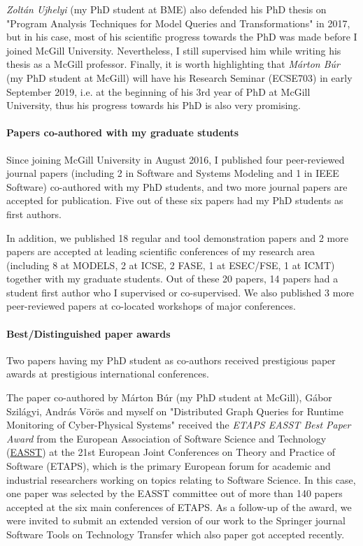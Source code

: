 \emph{Zoltán Ujhelyi} (my PhD student at BME) also defended his PhD thesis on "Program Analysis Techniques for Model Queries and Transformations" in 2017, but in his case, most of his scientific progress towards the PhD was made before I joined McGill University. Nevertheless, I still supervised him while writing his thesis as a McGill professor.  Finally, it is worth highlighting that \emph{Márton Búr} (my PhD student at McGill) will have his Research Seminar (ECSE703) in early September 2019, i.e. at the beginning of his 3rd year of PhD at McGill University, thus his progress towards his PhD is also very promising.

\paragraph{Papers co-authored with my graduate students}
Since joining McGill University in August 2016, I published four peer-reviewed journal papers (including 2 in Software and Systems Modeling and 1 in IEEE Software) co-authored with my PhD students,  and two more journal papers are accepted for publication. Five out of these six papers had my PhD students as first authors. 

In addition, we published 18 regular and tool demonstration papers and 2 more papers are accepted at leading scientific conferences of my research area (including 8 at MODELS, 2 at ICSE, 2 FASE, 1 at ESEC/FSE, 1 at ICMT) together with my graduate students. Out of these 20 papers,  14 papers had a student first author who I supervised or co-supervised. 
We also published 3 more peer-reviewed papers at co-located workshops of major conferences. 

\paragraph{Best/Distinguished paper awards}
Two papers having my PhD student as co-authors received prestigious paper awards at prestigious international conferences. 

The paper co-authored by Márton Búr (my PhD student at McGill), Gábor Szilágyi, András Vörös and myself on "Distributed Graph Queries for Runtime Monitoring of Cyber-Physical Systems" \cite{fase2018-cps} received the \emph{ETAPS EASST Best Paper Award} from the European Association of Software Science and Technology (\href{http://easst.aulp.co.uk/}{EASST}) at the 21st European Joint Conferences on Theory and Practice of Software (ETAPS), which is the primary European forum for academic and industrial researchers working on topics relating to Software Science. In this case, one paper was selected by the EASST committee out of more than 140 papers accepted at the six main conferences of ETAPS. As a follow-up of the award, we were invited to submit an extended version of our work to the Springer journal Software Tools on Technology Transfer which also paper \cite{sttt-2019-cps} got accepted recently. 

